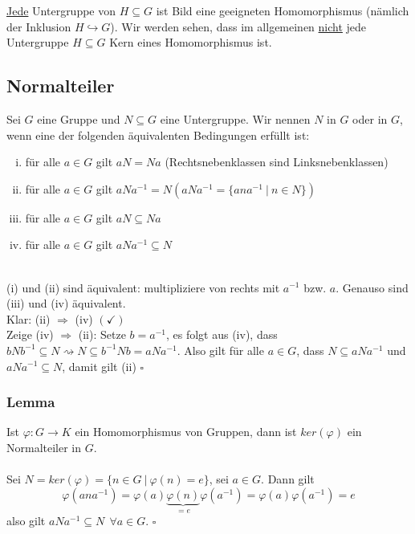 \uline{Jede} Untergruppe von $H\subseteq G$ ist Bild eine geeigneten Homomorphismus (nämlich der Inklusion $H \hookrightarrow G$). Wir werden sehen, dass im allgemeinen \uline{nicht} jede Untergruppe $H\subseteq G$ Kern eines Homomorphismus ist.

\subsection{Normalteiler}
\label{sub:normalteiler}
Sei $G$ eine Gruppe und $N\subseteq G$ eine Untergruppe. Wir nennen $N$  in $G$ oder  in $G$, wenn eine der folgenden äquivalenten Bedingungen erfüllt ist:
\begin{enumerate}[(i)]
	\item für alle $a\in G$ gilt $aN=Na$ (Rechtsnebenklassen sind Linksnebenklassen)
	\item für alle $a\in G$ gilt $aNa^{-1}=N (aNa^{-1}=\{ana^{-1}~|~n\in N \})$
	\item für alle $a\in G$ gilt $aN\subseteq Na$
	\item für alle $a\in G$ gilt $aNa^{-1}\subseteq N$
\end{enumerate}

\\
(i) und (ii) sind äquivalent: multipliziere von rechts mit $a^{-1}$ bzw. $a$. Genauso sind (iii) und (iv) äquivalent.\\
Klar: (ii) $\Rightarrow$ (iv) $(\checkmark)$\\
Zeige (iv) $\Rightarrow$ (ii): Setze $b=a^{-1}$, es folgt aus (iv), dass $bNb^{-1}\subseteq N \rightsquigarrow N\subseteq b^{-1}Nb=aNa^{-1}$. Also gilt für alle $a\in G$, dass $N\subseteq aNa^{-1}$ und $aNa^{-1}\subseteq N$, damit gilt (ii)
\hfill $\square$

\subsubsection*{Lemma}
Ist $\varphi: G \to K$ ein Homomorphismus von Gruppen, dann ist $ker(\varphi)$ ein Normalteiler in $G$.\\

\\
Sei $N=ker(\varphi)=\{n\in G~|~\varphi(n)=e\}$, sei $a\in G$. Dann gilt 
\[
\varphi(ana^{-1})=\varphi(a)\underbrace{\varphi(n)}_{=e}\varphi(a^{-1})=\varphi(a)\varphi(a^{-1})=e
\]
also gilt $aNa^{-1}\subseteq N~~\forall a\in G$.
\hfill $\square$

